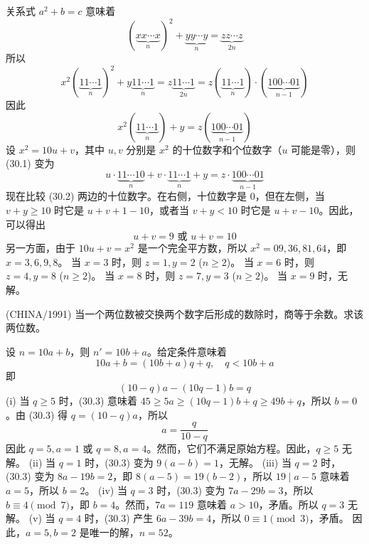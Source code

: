 \begin{questions}
\begin{solution}
关系式 $a^2 + b = c$ 意味着
\[
(\underbrace{xx \cdots x}_{n})^2 + \underbrace{yy \cdots y}_{n} = \underbrace{zz \cdots z}_{2n}
\]
所以
\[
x^2 (\underbrace{11 \cdots 1}_{n})^2 + y \underbrace{11 \cdots 1}_{n} = z \underbrace{11 \cdots 1}_{2n} = z (\underbrace{11 \cdots 1}_{n}) \cdot (\underbrace{100 \cdots 01}_{n-1})
\]
因此
\begin{equation}
x^2 (\underbrace{11 \cdots 1}_{n}) + y = z (\underbrace{100 \cdots 01}_{n-1}) \tag{30.1}
\end{equation}
设 $x^2 = 10u + v$，其中 $u, v$ 分别是 $x^2$ 的十位数字和个位数字（$u$ 可能是零），则 (30.1) 变为
\begin{equation}
u \cdot \underbrace{11 \cdots 10}_{n} + v \cdot \underbrace{11 \cdots 1}_{n} + y = z \cdot \underbrace{100 \cdots 01}_{n-1} \tag{30.2}
\end{equation}
现在比较 (30.2) 两边的十位数字。在右侧，十位数字是 0，但在左侧，当 $v + y \ge 10$ 时它是 $u + v + 1 - 10$，或者当 $v + y < 10$ 时它是 $u + v - 10$。因此，可以得出
\[
u + v = 9 \text{ 或 } u + v = 10
\]
另一方面，由于 $10u + v = x^2$ 是一个完全平方数，所以 $x^2 = 09, 36, 81, 64$，即 $x = 3, 6, 9, 8$。
当 $x = 3$ 时，则 $z = 1, y = 2$ ($n \ge 2$)。
当 $x = 6$ 时，则 $z = 4, y = 8$ ($n \ge 2$)。
当 $x = 8$ 时，则 $z = 7, y = 3$ ($n \ge 2$)。
当 $x = 9$ 时，无解。
\end{solution}

\question (CHINA/1991) 当一个两位数被交换两个数字后形成的数除时，商等于余数。求该两位数。

\begin{solution}
设 $n = 10a + b$，则 $n' = 10b + a$。给定条件意味着
\[
10a + b = (10b + a)q + q, \quad q < 10b + a
\]
即
\begin{equation}
(10 - q)a - (10q - 1)b = q \tag{30.3}
\end{equation}
(i) 当 $q \ge 5$ 时，(30.3) 意味着 $45 \ge 5a \ge (10q - 1)b + q \ge 49b + q$，所以 $b = 0$。由 (30.3) 得 $q = (10 - q)a$，所以
\[
a = \frac{q}{10 - q}
\]
因此 $q = 5, a = 1$ 或 $q = 8, a = 4$。然而，它们不满足原始方程。因此，$q \ge 5$ 无解。
(ii) 当 $q = 1$ 时，(30.3) 变为 $9(a - b) = 1$，无解。
(iii) 当 $q = 2$ 时，(30.3) 变为 $8a - 19b = 2$，即 $8(a - 5) = 19(b - 2)$，所以 $19 \mid a - 5$ 意味着 $a = 5$，所以 $b = 2$。
(iv) 当 $q = 3$ 时，(30.3) 变为 $7a - 29b = 3$，所以 $b \equiv 4 \pmod 7$，即 $b = 4$。然而，$7a = 119$ 意味着 $a > 10$，矛盾。所以 $q = 3$ 无解。
(v) 当 $q = 4$ 时，(30.3) 产生 $6a - 39b = 4$，所以 $0 \equiv 1 \pmod 3$，矛盾。
因此，$a = 5, b = 2$ 是唯一的解，$n = 52$。
\end{solution}


\end{questions}
